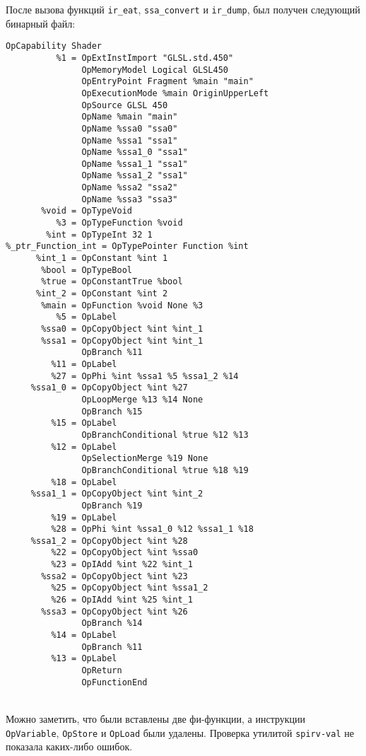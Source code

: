 \documentclass[14pt]{extarticle}
\begin{document}
После вызова функций \texttt{ir\_eat}, \texttt{ssa\_convert} и \texttt{ir\_dump}, был получен следующий бинарный файл:
\begin{lstlisting}[caption={бинарный \texttt{SPIR-V} файл в SSA форме}]
               OpCapability Shader
          %1 = OpExtInstImport "GLSL.std.450"
               OpMemoryModel Logical GLSL450
               OpEntryPoint Fragment %main "main"
               OpExecutionMode %main OriginUpperLeft
               OpSource GLSL 450
               OpName %main "main"
               OpName %ssa0 "ssa0"
               OpName %ssa1 "ssa1"
               OpName %ssa1_0 "ssa1"
               OpName %ssa1_1 "ssa1"
               OpName %ssa1_2 "ssa1"
               OpName %ssa2 "ssa2"
               OpName %ssa3 "ssa3"
       %void = OpTypeVoid
          %3 = OpTypeFunction %void
        %int = OpTypeInt 32 1
%_ptr_Function_int = OpTypePointer Function %int
      %int_1 = OpConstant %int 1
       %bool = OpTypeBool
       %true = OpConstantTrue %bool
      %int_2 = OpConstant %int 2
       %main = OpFunction %void None %3
          %5 = OpLabel
       %ssa0 = OpCopyObject %int %int_1
       %ssa1 = OpCopyObject %int %int_1
               OpBranch %11
         %11 = OpLabel
         %27 = OpPhi %int %ssa1 %5 %ssa1_2 %14
     %ssa1_0 = OpCopyObject %int %27
               OpLoopMerge %13 %14 None
               OpBranch %15
         %15 = OpLabel
               OpBranchConditional %true %12 %13
         %12 = OpLabel
               OpSelectionMerge %19 None
               OpBranchConditional %true %18 %19
         %18 = OpLabel
     %ssa1_1 = OpCopyObject %int %int_2
               OpBranch %19
         %19 = OpLabel
         %28 = OpPhi %int %ssa1_0 %12 %ssa1_1 %18
     %ssa1_2 = OpCopyObject %int %28
         %22 = OpCopyObject %int %ssa0
         %23 = OpIAdd %int %22 %int_1
       %ssa2 = OpCopyObject %int %23
         %25 = OpCopyObject %int %ssa1_2
         %26 = OpIAdd %int %25 %int_1
       %ssa3 = OpCopyObject %int %26
               OpBranch %14
         %14 = OpLabel
               OpBranch %11
         %13 = OpLabel
               OpReturn
               OpFunctionEnd

\end{lstlisting}
~\\ %

Можно заметить, что были вставлены две фи-функции, а инструкции \texttt{OpVariable}, \texttt{OpStore} и \texttt{OpLoad} были удалены. Проверка утилитой \texttt{spirv-val} не показала каких-либо ошибок.
\end{document}
